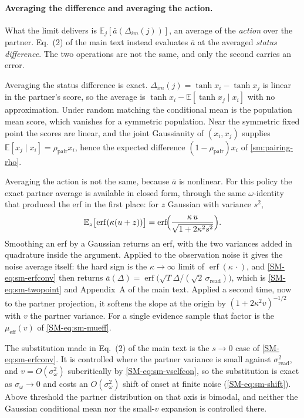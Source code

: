 \documentclass[
  aps,prx,
  preprint,
  superscriptaddress,
  nofootinbib
]{revtex4-2}
\newcommand{\rhopair}{\rho_{\mathrm{pair}}}
\newcommand{\sread}{\sigma_{\mathrm{read}}}
\newcommand{\sidn}{\sigma_{\omega}}
\begin{document}
\paragraph{Averaging the difference and averaging the action.} What the limit delivers is $\mathbb E_j[\bar a(\Delta_{im}(j))]$, an average of the \emph{action} over the partner. Eq.~(2) of the main text instead evaluates $\bar a$ at the averaged \emph{status difference}. The two operations are not the same, and only the second carries an error.

Averaging the status difference is exact. $\Delta_{im}(j)=\tanh x_i-\tanh x_j$ is linear in the partner's score, so the average is $\tanh x_i-\mathbb E[\tanh x_j\mid x_i]$ with no approximation. Under random matching the conditional mean is the population mean score, which vanishes for a symmetric population. Near the symmetric fixed point the scores are linear, and the joint Gaussianity of $(x_i,x_j)$ supplies $\mathbb E[x_j\mid x_i]=\rhopair x_i$, hence the expected difference $(1-\rhopair)x_i$ of \cref{sm:pairing-rho}.

Averaging the action is not the same, because $\bar a$ is nonlinear. For this policy the exact partner average is available in closed form, through the same $\omega$-identity that produced the erf in the first place: for $z$ Gaussian with variance $s^2$,
\begin{equation}\label{SM-eq:sm-erfconv}
\mathbb E_z\bigl[\operatorname{erf}(\kappa(u+z))\bigr]=\operatorname{erf}\!\Bigl(\frac{\kappa\,u}{\sqrt{1+2\kappa^2s^2}}\Bigr).
\end{equation}
Smoothing an erf by a Gaussian returns an erf, with the two variances added in quadrature inside the argument. Applied to the observation noise it gives the noise average itself: the hard sign is the $\kappa\to\infty$ limit of $\operatorname{erf}(\kappa\,\cdot)$, and \cref{SM-eq:sm-erfconv} then returns $\bar a(\Delta)=\operatorname{erf}\bigl(\sqrt T\Delta/(\sqrt2\,\sread)\bigr)$, which is \cref{SM-eq:sm-twopoint} and Appendix~A of the main text. Applied a second time, now to the partner projection, it softens the slope at the origin by $(1+2\kappa^2v)^{-1/2}$ with $v$ the partner variance. For a single evidence sample that factor is the $\mu_{\mathrm{eff}}(v)$ of \cref{SM-eq:sm-mueff}.

The substitution made in Eq.~(2) of the main text is the $s\to0$ case of \cref{SM-eq:sm-erfconv}. It is controlled where the partner variance is small against $\sread^2$, and $v=O(\sidn^2)$ subcritically by \cref{SM-eq:sm-vselfcon}, so the substitution is exact as $\sidn\to0$ and costs an $O(\sidn^2)$ shift of onset at finite noise (\cref{SM-eq:sm-shift}). Above threshold the partner distribution on that axis is bimodal, and neither the Gaussian conditional mean nor the small-$v$ expansion is controlled there.
\end{document}
